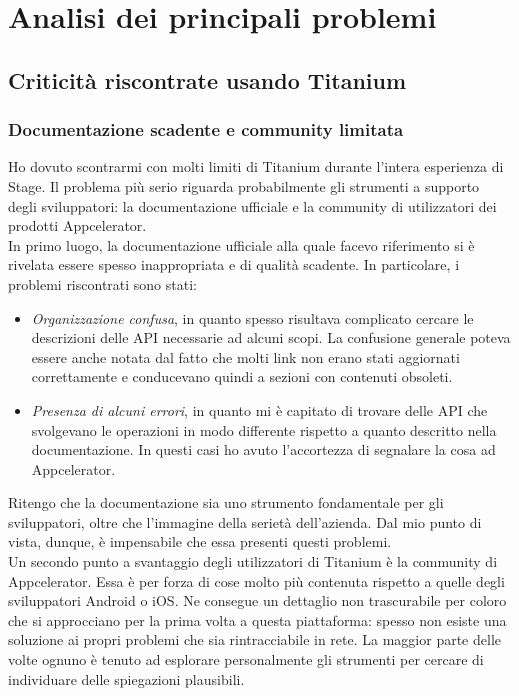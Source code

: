 	\section{Analisi dei principali problemi}
		\subsection{Criticità riscontrate usando Titanium}
			\subsubsection{Documentazione scadente e community limitata}
				Ho dovuto scontrarmi con molti limiti di Titanium durante l'intera esperienza di Stage. Il problema più serio
				riguarda probabilmente gli strumenti a supporto degli sviluppatori: la documentazione ufficiale e la community di
				utilizzatori dei prodotti Appcelerator.\\
				In primo luogo, la documentazione ufficiale alla quale facevo riferimento si è rivelata essere spesso inappropriata e
				di qualità scadente. In particolare, i problemi riscontrati sono stati:
				\begin{itemize}
					\item \emph{Organizzazione confusa}, in quanto spesso risultava complicato cercare le descrizioni delle API
					necessarie ad alcuni scopi. La confusione generale poteva essere anche notata dal fatto che molti link non
					erano stati aggiornati correttamente e conducevano quindi a sezioni con contenuti obsoleti.
					\item \emph{Presenza di alcuni errori}, in quanto mi è capitato di trovare delle API che svolgevano le
					operazioni in modo differente rispetto a quanto descritto nella documentazione. In questi casi ho avuto
					l'accortezza di segnalare la cosa ad Appcelerator.
				\end{itemize}
				Ritengo che la documentazione sia uno strumento fondamentale per gli sviluppatori, oltre che l'immagine della serietà
				dell'azienda. Dal mio punto di vista, dunque, è impensabile che essa presenti questi problemi.\\
				Un secondo punto a svantaggio degli utilizzatori di Titanium è la community di Appcelerator. Essa è per forza di cose
				molto più contenuta rispetto a quelle degli sviluppatori Android o iOS. Ne consegue un dettaglio non trascurabile per
				coloro che si approcciano per la prima volta a questa piattaforma: spesso non esiste una soluzione ai propri problemi
				che sia rintracciabile in rete. La maggior parte delle volte ognuno è tenuto ad esplorare personalmente gli strumenti
				per cercare di individuare delle spiegazioni plausibili.
